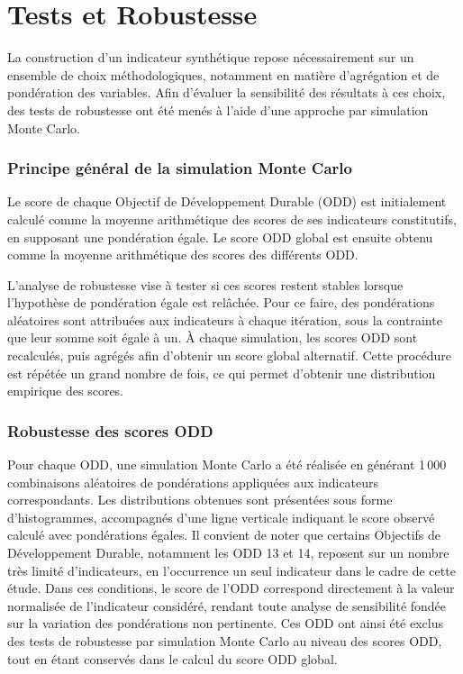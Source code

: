 \chapter{Tests et Robustesse}

La construction d’un indicateur synthétique repose nécessairement sur un ensemble de choix méthodologiques, notamment en matière d’agrégation et de pondération des variables. Afin d’évaluer la sensibilité des résultats à ces choix, des tests de robustesse ont été menés à l’aide d’une approche par simulation Monte Carlo.

\subsection{Principe général de la simulation Monte Carlo}

Le score de chaque Objectif de Développement Durable (ODD) est initialement calculé comme la moyenne arithmétique des scores de ses indicateurs constitutifs, en supposant une pondération égale. Le score ODD global est ensuite obtenu comme la moyenne arithmétique des scores des différents ODD.

L’analyse de robustesse vise à tester si ces scores restent stables lorsque l’hypothèse de pondération égale est relâchée. Pour ce faire, des pondérations aléatoires sont attribuées aux indicateurs à chaque itération, sous la contrainte que leur somme soit égale à un. À chaque simulation, les scores ODD sont recalculés, puis agrégés afin d’obtenir un score global alternatif. Cette procédure est répétée un grand nombre de fois, ce qui permet d’obtenir une distribution empirique des scores.

\subsection{Robustesse des scores ODD}


Pour chaque ODD, une simulation Monte Carlo a été réalisée en générant 1\,000 combinaisons aléatoires de pondérations appliquées aux indicateurs correspondants. Les distributions obtenues sont présentées sous forme d’histogrammes, accompagnés d’une ligne verticale indiquant le score observé calculé avec pondérations égales.
Il convient de noter que certains Objectifs de Développement Durable, notamment les ODD 13 et 14, reposent sur un nombre très limité d’indicateurs, en l’occurrence un seul indicateur dans le cadre de cette étude. Dans ces conditions, le score de l’ODD correspond directement à la valeur normalisée de l’indicateur considéré, rendant toute analyse de sensibilité fondée sur la variation des pondérations non pertinente. Ces ODD ont ainsi été exclus des tests de robustesse par simulation Monte Carlo au niveau des scores ODD, tout en étant conservés dans le calcul du score ODD global.

